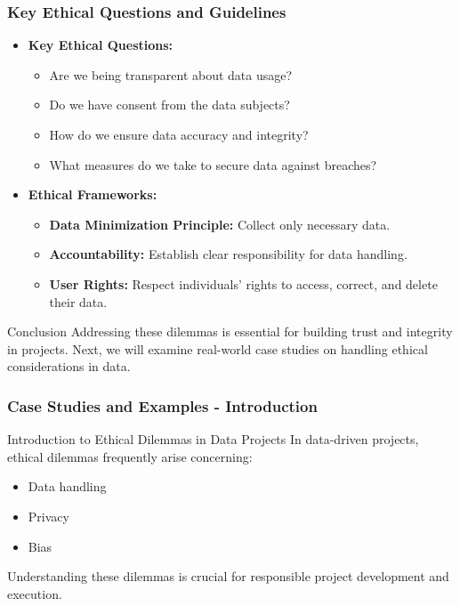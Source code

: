 \documentclass[aspectratio=169]{beamer}
\begin{document}
\begin{frame}[fragile]
    \frametitle{Key Ethical Questions and Guidelines}
    \begin{itemize}
        \item \textbf{Key Ethical Questions:}
        \begin{itemize}
            \item Are we being transparent about data usage?
            \item Do we have consent from the data subjects?
            \item How do we ensure data accuracy and integrity?
            \item What measures do we take to secure data against breaches?
        \end{itemize}
        
        \item \textbf{Ethical Frameworks:}
        \begin{itemize}
            \item \textbf{Data Minimization Principle:} Collect only necessary data.
            \item \textbf{Accountability:} Establish clear responsibility for data handling.
            \item \textbf{User Rights:} Respect individuals' rights to access, correct, and delete their data.
        \end{itemize}
    \end{itemize}
    \begin{block}{Conclusion}
        Addressing these dilemmas is essential for building trust and integrity in projects. 
        Next, we will examine real-world case studies on handling ethical considerations in data.
    \end{block}
\end{frame}

\begin{frame}[fragile]
    \frametitle{Case Studies and Examples - Introduction}
    \begin{block}{Introduction to Ethical Dilemmas in Data Projects}
        In data-driven projects, ethical dilemmas frequently arise concerning:
        \begin{itemize}
            \item Data handling
            \item Privacy
            \item Bias
        \end{itemize}
        Understanding these dilemmas is crucial for responsible project development and execution.
    \end{block}
\end{frame}
\end{document}

